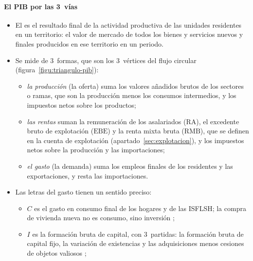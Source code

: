 \documentclass[11pt]{article}
\begin{document}
\paragraph{El PIB por las 3~vías}

\begin{itemize}
\item El  es el resultado final de la actividad productiva de las unidades residentes en un territorio: el valor de mercado de todos los bienes y servicios nuevos y finales producidos en ese territorio en un periodo\nocite{SEC2010}.
\item Se mide de 3~formas, que son los 3~vértices del flujo circular (figura~\ref{figu:triangulo-pib}):
  \begin{itemize}
  \item \emph{la producción} (la oferta) suma los valores añadidos brutos de los sectores o ramas, que son la producción menos los consumos intermedios, y los impuestos netos sobre los productos;
  \item \emph{las rentas} suman la remuneración de los asalariados ($\mathrm{RA}$), el excedente bruto de explotación ($\mathrm{EBE}$) y la renta mixta bruta ($\mathrm{RMB}$), que se definen en la cuenta de explotación (apartado~\ref{sec:explotacion}), y los impuestos netos sobre la producción y las importaciones;
  \item \emph{el gasto} (la demanda) suma los empleos finales de los residentes y las exportaciones, y resta las importaciones.
  \end{itemize}
\item Las letras del gasto tienen un sentido preciso:
  \begin{itemize}
  \item $C$ es el gasto en consumo final de los hogares y de las ISFLSH; la compra de vivienda nueva no es consumo, sino inversión ;
  \item $I$ es la formación bruta de capital, con 3~partidas: la formación bruta de capital fijo, la variación de existencias y las adquisiciones menos cesiones de objetos valiosos ;

\end{itemize}
\end{itemize}
\end{document}
